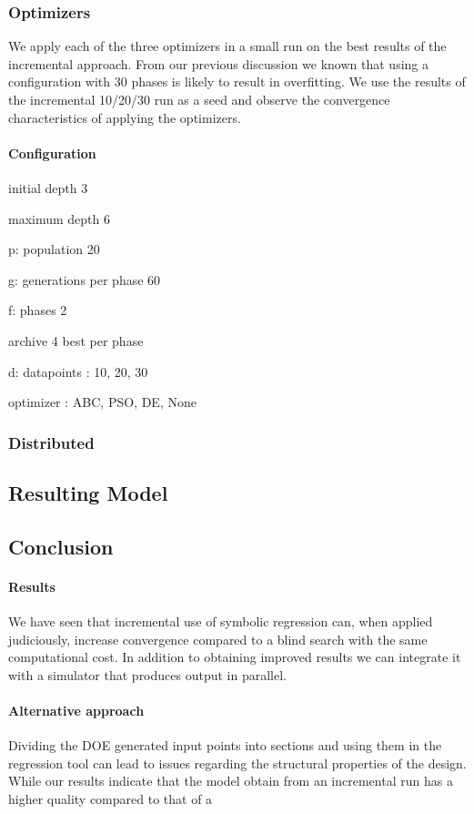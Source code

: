 \subsubsection{Optimizers}
We apply each of the three optimizers in a small run on the best results of the incremental approach. From our previous discussion we known that using a configuration with 30 phases is likely to result in overfitting. We use the results of the incremental 10/20/30 run as a seed and observe the convergence characteristics of applying the optimizers.
\paragraph{Configuration}
\item initial depth 3
\item maximum depth 6
\item p: population 20
\item g: generations per phase 60
\item f: phases 2
\item archive 4 best per phase
\item d: datapoints : 10, 20, 30
\item optimizer : ABC, PSO, DE, None

\subsubsection{Distributed}
\subsection{Resulting Model}
\subsection{Conclusion}
\paragraph{Results}
We have seen that incremental use of symbolic regression can, when applied judiciously, increase convergence compared to a blind search with the same computational cost. In addition to obtaining improved results we can integrate it with a simulator that produces output in parallel.
\paragraph{Alternative approach}
Dividing the DOE generated input points into sections and using them in the regression tool can lead to issues regarding the structural properties of the design. While our results indicate that the model obtain from an incremental run has a higher quality compared to that  of a 
